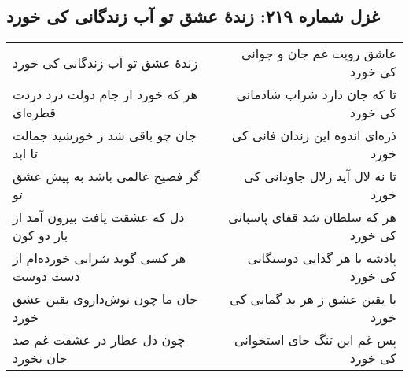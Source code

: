 \begin{center}
\section*{غزل شماره ۲۱۹: زندهٔ عشق تو آب زندگانی کی خورد}
\label{sec:219}
\begin{longtable}{l p{0.5cm} r}
زندهٔ عشق تو آب زندگانی کی خورد
&&
عاشق رویت غم جان و جوانی کی خورد
\\
هر که خورد از جام دولت درد دردت قطره‌ای
&&
تا که جان دارد شراب شادمانی کی خورد
\\
جان چو باقی شد ز خورشید جمالت تا ابد
&&
ذره‌ای اندوه این زندان فانی کی خورد
\\
گر فصیح عالمی باشد به پیش عشق تو
&&
تا نه لال آید زلال جاودانی کی خورد
\\
دل که عشقت یافت بیرون آمد از بار دو کون
&&
هر که سلطان شد قفای پاسبانی کی خورد
\\
هر کسی گوید شرابی خورده‌ام از دست دوست
&&
پادشه با هر گدایی دوستگانی کی خورد
\\
جان ما چون نوش‌داروی یقین عشق خورد
&&
با یقین عشق ز هر بد گمانی کی خورد
\\
چون دل عطار در عشقت غم صد جان نخورد
&&
پس غم این تنگ جای استخوانی کی خورد
\\
\end{longtable}
\end{center}
